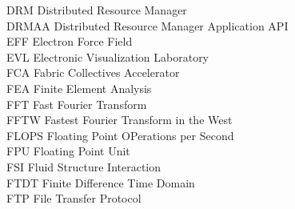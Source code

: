 \begin{tabbing}
DRM     \> Distributed Resource Manager\\
DRMAA   \> Distributed Resource Manager  Application API\\
EFF     \> Electron Force Field\\
EVL     \> Electronic Visualization Laboratory\\
FCA     \> Fabric Collectives Accelerator\\
FEA     \> Finite Element Analysis\\
FFT     \> Fast Fourier Transform\\
FFTW    \> Fastest Fourier Transform in the West\\
FLOPS   \> Floating Point OPerations per Second\\
FPU     \> Floating Point Unit\\
FSI     \> Fluid Structure Interaction\\
FTDT    \> Finite Difference Time Domain\\
FTP     \> File Transfer Protocol
\end{tabbing}
